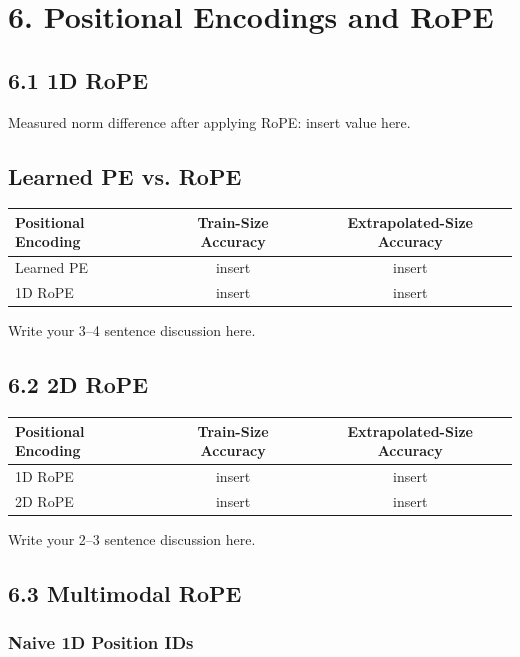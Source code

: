 \documentclass[11pt]{article}
\begin{document}
\section*{6. Positional Encodings and RoPE}

\subsection*{6.1 1D RoPE}

Measured norm difference after applying RoPE: insert value here.

\subsection*{Learned PE vs. RoPE}

\begin{center}
\begin{tabular}{l c c}
\toprule
Positional Encoding & Train-Size Accuracy & Extrapolated-Size Accuracy \\
\midrule
Learned PE & insert & insert \\
1D RoPE & insert & insert \\
\bottomrule
\end{tabular}
\end{center}

Write your 3--4 sentence discussion here.

\subsection*{6.2 2D RoPE}

\begin{center}
\begin{tabular}{l c c}
\toprule
Positional Encoding & Train-Size Accuracy & Extrapolated-Size Accuracy \\
\midrule
1D RoPE & insert & insert \\
2D RoPE & insert & insert \\
\bottomrule
\end{tabular}
\end{center}

Write your 2--3 sentence discussion here.

\subsection*{6.3 Multimodal RoPE}

\subsubsection*{Naive 1D Position IDs}
\end{document}
